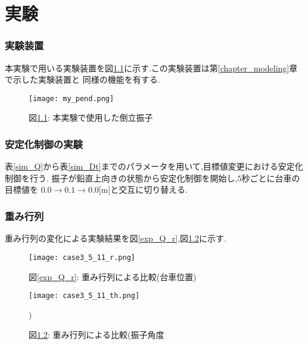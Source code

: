\chapter{実験}

\subsection{実験装置}
本実験で用いる実験装置を図\ref{my_pend}に示す.この実験装置は第\ref{chapter_modeling}章で示した実験装置と
同様の機能を有する.

\begin{figure}[htbp]
    \begin{center}
        \texttt{[image: my\_pend.png]}
        \caption{図\ref{my_pend}: 本実験で使用した倒立振子}
        \label{my_pend}
    \end{center}
\end{figure}


\subsection{安定化制御の実験}
表\ref{sim_Q}から表\ref{sim_Dt}までのパラメータを用いて,目標値変更における安定化制御を行う.
振子が鉛直上向きの状態から安定化制御を開始し,$5$秒ごとに台車の目標値を
$0.0 \to 0.1 \to 0.0$[m]と交互に切り替える.

\subsection{重み行列}
重み行列の変化による実験結果を図\ref{exp_Q_r},図\ref{exp_Q_th}に示す.

\begin{figure}[htbp]
    \begin{minipage}{0.5\hsize}
        \begin{center}
            \texttt{[image: case3\_5\_11\_r.png]}
            \caption{図\ref{exp_Q_r}: 重み行列による比較(台車位置)}
            \label{exp_Q_r}
        \end{center}
    \end{minipage}
    \begin{minipage}{0.5\hsize}
        \begin{center}
            \texttt{[image: case3\_5\_11\_th.png]}
            \caption{図\ref{exp_Q_th}: 重み行列による比較(振子角度})
            \label{exp_Q_th}
        \end{center}
    \end{minipage}
\end{figure}

